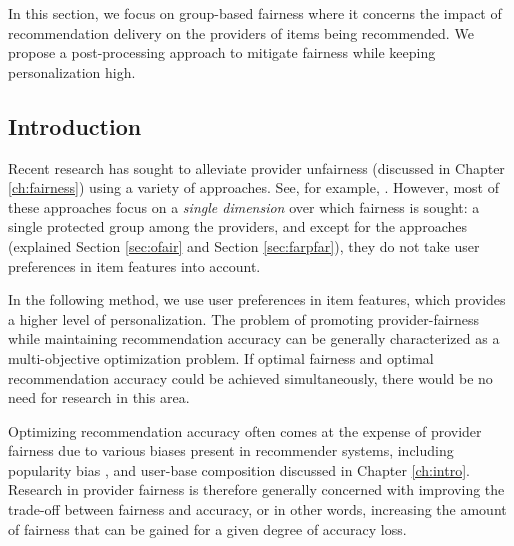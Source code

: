 \label{sec:ofair}



In this section, we focus on group-based fairness where it concerns the impact of recommendation delivery on the providers of items being recommended\cite{burke2017multisided}. We propose a post-processing approach to mitigate fairness while keeping personalization high.

\subsection{Introduction}

Recent research has sought to alleviate provider unfairness (discussed in Chapter \ref{ch:fairness}) using a variety of approaches. See, for example, \cite{yao2017beyond,burke2018balanced,ekstrand2018exploring,liu2019personalized,kamishima2016model,beutel2019fairness}. However, most of these approaches focus on a \emph{single dimension} over which fairness is sought: a single protected group among the providers, and except for the approaches \cite{liu2019personalized,sonboli2020opportunistic} (explained Section \ref{sec:ofair} and Section \ref{sec:farpfar}), they do not take user preferences in item features into account. 

In the following method, we use user preferences in item features, which provides a higher level of personalization. The problem of promoting provider-fairness while maintaining recommendation accuracy can be generally characterized as a multi-objective optimization problem. If optimal fairness and optimal recommendation accuracy could be achieved simultaneously, there would be no need for research in this area. 

Optimizing recommendation accuracy often comes at the expense of provider fairness due to various biases present in recommender systems, including popularity bias \cite{celma2008hits,lee2014fairness}, and user-base composition \cite{lin2019crank, yao2017beyond} discussed in Chapter \ref{ch:intro}. Research in provider fairness is therefore generally concerned with improving the trade-off between fairness and accuracy, or in other words, increasing the amount of fairness that can be gained for a given degree of accuracy loss.

